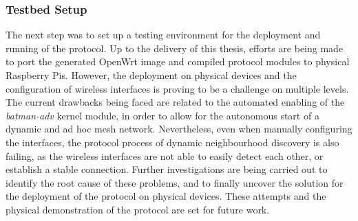 \subsubsection{Testbed Setup} \label{sec:infrastructure:testbed}


The next step was to set up a testing environment for the deployment and running of the \pol{} protocol. Up to the delivery of this thesis, efforts are being made to port the generated OpenWrt image and compiled protocol modules to physical Raspberry Pis. However, the deployment on physical devices and the configuration of wireless interfaces is proving to be a challenge on multiple levels. The current drawbacks being faced are related to the automated enabling of the \emph{batman-adv} kernel module, in order to allow for the autonomous start of a dynamic and ad hoc mesh network. Nevertheless, even when manually configuring the interfaces, the protocol process of dynamic neighbourhood discovery is also failing, as the wireless interfaces are not able to easily detect each other, or establish a stable connection. Further investigations are being carried out to identify the root cause of these problems, and to finally uncover the solution for the deployment of the protocol on physical devices. These attempts and the physical demonstration of the \pol{} protocol are set for future work.


